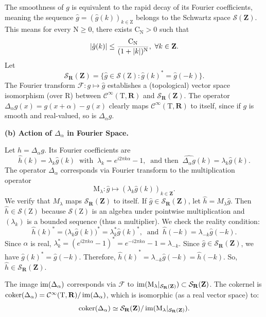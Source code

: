 \documentclass[10pt,letterpaper,reqno]{amsart}
\theoremstyle{article}
\newcommand{\1}{{\hat 1}}
\newcommand{\0}{{\hat 0}}
\newcommand{\RR}{\mathbf R}
\newcommand{\ZZ}{\mathbf Z}
\newcommand{\cF}{{\mathcal F}}
\newcommand{\cS}{{\mathcal S}}
\def \C{\mathrm C}
\def \M{\mathrm M}
\def \N{\mathrm N}
\def \R{\mathrm R}
\def \T{\mathrm T}
\def \Z{\mathrm Z}
\renewcommand{\over}{\above .2pt}
\newcommand{\coker}{\operatorname{coker}}
\newcommand{\Cinfty}{\mathcal{C}^\infty}
\newcommand{\im}{\operatorname{\rm im}}
\begin{document}
    The smoothness of $g$ is equivalent to the rapid decay of its Fourier coefficients,
    meaning the sequence $\hat{g} = (\hat{g}(k))_{k \in \Z}$ belongs to the Schwartz space $\cS(\ZZ)$.
    This means for every $\N \ge 0$,
    there exists $\C_\N > 0$ such that
    $$
      |\hat{g}(k)| \le {\C_\N \over (1+|k|)^\N}, \ \forall k \in \ZZ.
      $$
    Let
    $$
      \cS_{\RR}(\ZZ) = \{ \hat{g} \in \cS(\Z) : {\hat{g}(k)}^* = \hat{g}(-k) \}.
      $$
    The Fourier transform $\cF: g \mapsto \hat{g}$ establishes a (topological) vector space isomorphism (over $\R$) between $\Cinfty(\T,\RR)$ and $\cS_{\RR}(\ZZ)$.
    The operator $\Delta_\alpha g(x) = g(x+\alpha) - g(x)$ clearly maps $\Cinfty(\T,\RR)$ to itself,
    since if $g$ is smooth and real-valued,
    so is $\Delta_\alpha g$.
    
    \textbf{(b) Action of $\Delta_\alpha$ in Fourier Space.}
    
    Let $h = \Delta_\alpha g$.
    Its Fourier coefficients are
    $$
      \hat{h}(k) = \lambda_k \hat{g}(k)
      \ \text{ with } \
      \lambda_k = e^{i2\pi k \alpha} - 1,
      \ \text{ and then } \
      \widehat{\Delta_\alpha g}(k) = \lambda_k \hat{g}(k).
      $$
    The operator $\Delta_\alpha$ corresponds via Fourier transform to the multiplication operator
    $$
      \M_\lambda: \hat{g} \mapsto (\lambda_k \hat{g}(k))_{k\in\ZZ}.
      $$
    We verify that $M_\lambda$ maps $\cS_{\RR}(\ZZ)$ to itself.
    If $\hat{g} \in \cS_{\RR}(\ZZ)$,
    let $\hat{h} = M_\lambda \hat{g}$.
    Then $\hat{h} \in \cS(\Z)$ because $\cS(\Z)$ is an algebra under pointwise multiplication and $(\lambda_k)$ is a bounded sequence (thus a multiplier).
    We check the reality condition:
    $$
      \hat{h}(k)^* = \big(\lambda_k \hat{g}(k)\big)^* = \lambda_k^* \hat{g}(k)^*,
      \ \text{ and } \
      \hat{h}(-k) = \lambda_{-k} \hat{g}(-k).
      $$
    Since $\alpha$ is real,
    $\lambda_k^* = (e^{i2\pi k \alpha} - 1)^* = e^{-i2\pi k \alpha} - 1 = \lambda_{-k}$.
    Since $\hat{g} \in \cS_{\RR}(\ZZ)$,
    we have ${\hat{g}(k)}^* = \hat{g}(-k)$.
    Therefore,
    ${\hat{h}(k)}^* = \lambda_{-k} \hat{g}(-k) = \hat{h}(-k)$.
    So,
    $\hat{h} \in \cS_{\RR}(\ZZ)$.
    
    The image $\im(\Delta_\alpha)$ corresponds via $\cF$ to $\im(\M_\lambda|_{\cS_{\RR}(\ZZ)}) \subset \cS_{\RR}(\ZZ)$.
    The cokernel is $\coker(\Delta_\alpha) = \Cinfty(\T,\RR) / \im(\Delta_\alpha)$,
    which is isomorphic (as a real vector space) to:
    $$
      \coker(\Delta_\alpha) \simeq \cS_{\RR}(\ZZ) / \im(\M_\lambda|_{\cS_{\RR}(\ZZ)}).
      $$
    
\end{document}
